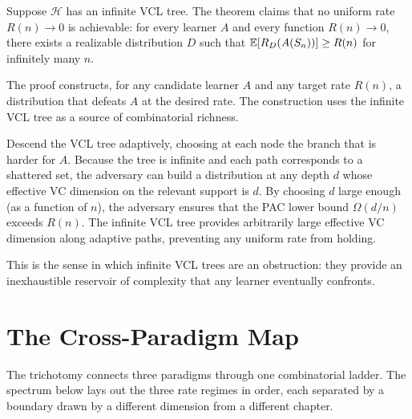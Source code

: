 Suppose $\mathcal{H}$ has an infinite VCL tree.  The theorem claims that no
uniform rate $R(n) \to 0$ is achievable: for every learner $A$ and every
function $R(n) \to 0$, there exists a realizable distribution $D$ such that
$\mathbb{E}[R_D(A(S_n))] \geq R(n)$ for infinitely many $n$.

The proof constructs, for any candidate learner $A$ and any target rate
$R(n)$, a distribution that defeats $A$ at the desired rate.  The
construction uses the infinite VCL tree as a source of combinatorial
richness.

Descend the VCL tree adaptively, choosing at each node the branch that is
harder for $A$.  Because the tree is infinite and each path corresponds to a
shattered set, the adversary can build a distribution at any depth $d$ whose
effective VC dimension on the relevant support is $d$.  By choosing $d$
large enough (as a function of $n$), the adversary ensures that the PAC
lower bound $\Omega(d/n)$ exceeds $R(n)$.  The infinite VCL tree provides
arbitrarily large effective VC dimension along adaptive paths, preventing
any uniform rate from holding.

This is the sense in which infinite VCL trees are an obstruction: they
provide an inexhaustible reservoir of complexity that any learner eventually
confronts.



\section{The Cross-Paradigm Map}
\label{sec:cross-paradigm}

The trichotomy connects three paradigms through one combinatorial ladder.
The spectrum below lays out the three rate regimes in order, each separated
by a boundary drawn by a different dimension from a different chapter.

